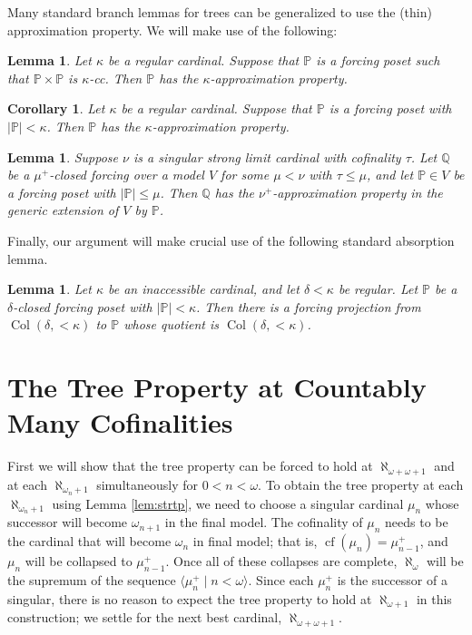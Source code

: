 \documentclass[psamsfonts]{amsart}
\newtheorem{cor}[thm]{Corollary}
\newtheorem{lemma}[thm]{Lemma}
\theoremstyle{definition}
\newcommand{\Q}{\mathbb{Q}}
\newcommand{\PP}{\mathbb{P}}
\newcommand{\ka}{\kappa}
\newcommand{\w}{\omega}
\DeclareMathOperator{\cf}{cf}
\DeclareMathOperator{\Coll}{Col}
\numberwithin{equation}{section}
\begin{document}
Many standard branch lemmas for trees can be generalized to use the (thin) approximation property. We will make use of the following:

\begin{lemma}\label{lem:approxprop}\cite[Lemma 2.4]{UngerAtrees}
	Let $\ka$ be a regular cardinal. Suppose that $\PP$ is a forcing poset such that $\PP\times \PP$ is $\ka$-cc. Then $\PP$ has the $\ka$-approximation property.
\end{lemma}
\begin{cor}\label{cor:smallbranch}
	Let $\ka$ be a regular cardinal. Suppose that $\PP$ is a forcing poset with $|\PP| < \ka$. Then $\PP$ has the $\ka$-approximation property.
\end{cor}

\begin{lemma}\label{lem:cc+closed=approx}\cite[Lemma 2.20]{adkisson:ITP}
	Suppose $\nu$ is a singular strong limit cardinal with cofinality $\tau$. Let $\Q$ be a $\mu^+$-closed forcing over a model $V$ for some $\mu<\nu$ with $\tau \leq \mu$, and let $\PP\in V$ be a forcing poset with $|\PP|\leq \mu$. Then $\Q$ has the $\nu^+$-approximation property in the generic extension of $V$ by $\PP$.
\end{lemma}

Finally, our argument will make crucial use of the following standard absorption lemma.
\begin{lemma}\label{lem:colabsorption}\cite[Theorem 14.3]{cummings:handbook}
	Let $\ka$ be an inaccessible cardinal, and let $\delta < \ka$ be regular. Let $\PP$ be a $\delta$-closed forcing poset with $|\PP| < \ka$. Then there is a forcing projection from $\Coll(\delta, <\ka)$ to $\PP$ whose quotient is $\Coll(\delta, <\ka)$.
\end{lemma}

\section{The Tree Property at Countably Many Cofinalities}\label{section:TP}
First we will show that the tree property can be forced to hold at $\aleph_{\w+\w+1}$ and at each $\aleph_{\w_n+1}$ simultaneously for $0<n<\w$. To obtain the tree property at each $\aleph_{\w_n+1}$ using Lemma \ref{lem:strtp}, we need to choose a singular cardinal $\mu_n$ whose successor will become $\w_{n+1}$ in the final model. The cofinality of $\mu_n$ needs to be the cardinal that will become $\w_{n}$ in final model; that is, $\cf(\mu_n) = \mu_{n-1}^+$, and $\mu_n$ will be collapsed to $\mu_{n-1}^+$. Once all of these collapses are complete, $\aleph_{\w}$ will be the supremum of the sequence $\langle \mu_n^+\mid n < \w\rangle$. Since each $\mu_n^+$ is the successor of a singular, there is no reason to expect the tree property to hold at $\aleph_{\w+1}$ in this construction; we settle for the next best cardinal, $\aleph_{\w+\w+1}$.
\end{document}
